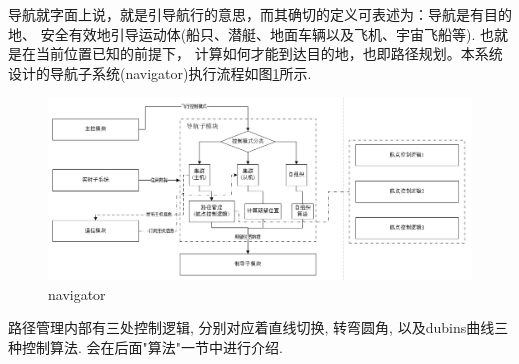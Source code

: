     导航就字面上说，就是引导航行的意思，而其确切的定义可表述为：导航是有目的地、
    安全有效地引导运动体(船只、潜艇、地面车辆以及飞机、宇宙飞船等). 也就是在当前位置已知的前提下，
    计算如何才能到达目的地，也即路径规划。本系统设计的导航子系统(navigator)执行流程如图\ref{fig:navigator}所示.
    \begin{figure}[htbp]
        \centering
        \includegraphics[width=\textwidth]{pictures/navigator.png}
        \caption{navigator}
        \label{fig:navigator}
    \end{figure}
    路径管理内部有三处控制逻辑, 分别对应着直线切换, 转弯圆角, 以及dubins曲线三种控制算法. 会在后面"算法"一节中进行介绍. 


